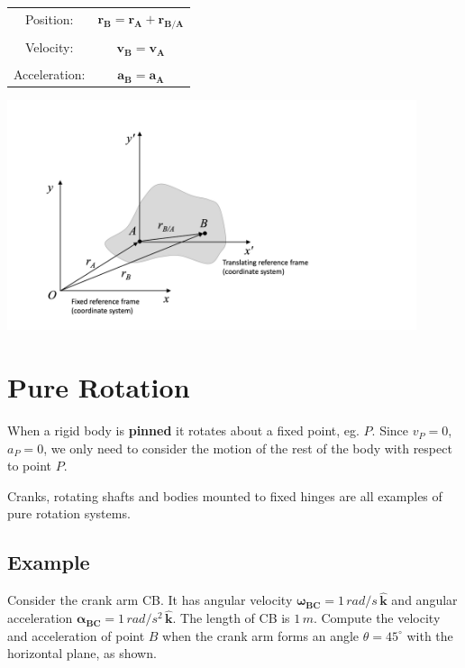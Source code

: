 \documentclass[12pt,letterpaper,twoside]{report}
\begin{document}
\begin{minipage}[c]{0.3\textwidth}
\begin{tabular}{  c  c }
Position: & $\bm{r_B} = \bm{r_A} + \bm{r_{B/A}}$\\
 &  \\
Velocity: & $\bm{v_B} = \bm{v_A} $\\
 &  \\
Acceleration: & $\bm{a_B} = \bm{a_A} $\\
\end{tabular}
\label{tab:singlebest}
\end{minipage}%
\begin{minipage}[c]{0.7\textwidth}
\includegraphics[trim={3cm 0cm 7.5cm 1.5cm},clip,width=0.9\textwidth, right]{Slide5}
\end{minipage}

\section{Pure Rotation}

When a rigid body is \textbf{pinned} it rotates about a fixed point, eg. $P$.  Since $v_P=0$, $a_P=0$, we only need to consider the motion of the rest of the body with respect to point $P$.  

Cranks, rotating shafts and bodies mounted to fixed hinges are all examples of pure rotation systems.  

\subsection{Example}
Consider the crank arm CB.  It has angular velocity $\bm{\omega_{BC}}=1 \, rad/s \, \bm{\hat{k}}$ and angular acceleration $\bm{\alpha_{BC}} =1 \, rad/s^2 \, \bm{\hat{k}}$.  The length of CB is $1 \, m$.  Compute the velocity and acceleration of point $B$ when the crank arm forms an angle $\theta =45^{\circ}$ with the horizontal plane, as shown. 
\end{document}
